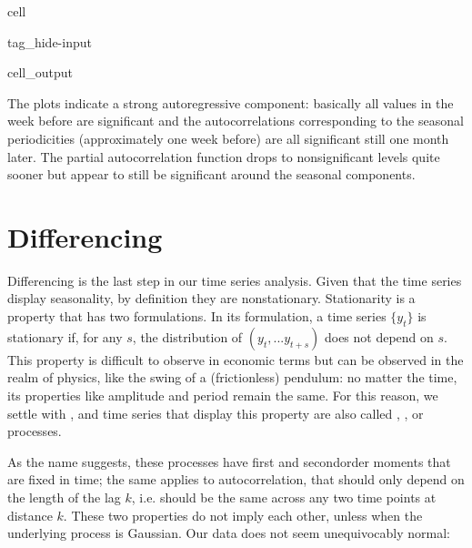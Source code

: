 \documentclass[letterpaper,10pt,english]{jupyterBook}
\begin{document}
\begin{sphinxuseclass}{cell}
\begin{sphinxuseclass}{tag_hide-input}
\begin{sphinxuseclass}{cell_output}
\begin{sphinxVerbatim}[commandchars=\\\{\}]
[]
\end{sphinxVerbatim}

\noindent{}

\end{sphinxuseclass}
\end{sphinxuseclass}
\end{sphinxuseclass}
\sphinxAtStartPar
The plots indicate a strong auto\sphinxhyphen{}regressive component: basically all values in the week before are significant and the autocorrelations corresponding to the seasonal periodicities (approximately one week before) are all significant still one month later. The partial autocorrelation function drops to non\sphinxhyphen{}significant levels quite sooner but appear to still be significant around the seasonal components.


\section{Differencing}
\label{\detokenize{05-time_series_analysis:differencing}}
\sphinxAtStartPar
Differencing is the last step in our time series analysis. Given that the time series display seasonality, by definition they are non\sphinxhyphen{}stationary. Stationarity is a property that has two formulations. In its  formulation, a time series \(\{y_t\}\) is stationary if, for any \(s\), the distribution of \((y_t,... y_{t+s})\) does not depend on \(s\). This property is difficult to observe in economic terms \sphinxhyphen{} but can be observed in the realm of physics, like the swing of a (frictionless) pendulum: no matter the time, its properties like amplitude and period remain the same. For this reason, we settle with , and time series that display this property are also called , , or  processes.

\sphinxAtStartPar
As the name suggests, these processes have first and second\sphinxhyphen{}order moments that are fixed in time; the same applies to auto\sphinxhyphen{}correlation, that should only depend on the length of the lag \(k\), i.e. should be the same across any two time points at distance \(k\). These two properties do not imply each other, unless when the underlying process is Gaussian. Our data does not seem unequivocably normal:
\end{document}
